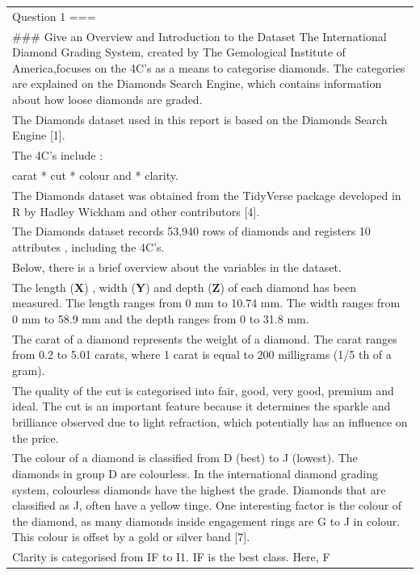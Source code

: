 \documentclass[
]{article}
\begin{document}
\begin{longtable}[]{@{}
  >{\raggedright\arraybackslash}p{}@{}}
\toprule\noalign{}
\endhead
\bottomrule\noalign{}
\endlastfoot
Question 1 === \\
\#\#\# Give an Overview and Introduction to the Dataset The
International Diamond Grading System, created by The Gemological
Institute of America,focuses on the 4C's as a means to categorise
diamonds. The categories are explained on the Diamonds Search Engine,
which contains information about how loose diamonds are graded. \\
The Diamonds dataset used in this report is based on the Diamonds Search
Engine {[}1{]}. \\
The 4C's include : \\
* carat * cut * colour and * clarity. \\
The Diamonds dataset was obtained from the TidyVerse package developed
in R by Hadley Wickham and other contributors {[}4{]}. \\
The Diamonds dataset records 53,940 rows of diamonds and registers 10
attributes , including the 4C's. \\
Below, there is a brief overview about the variables in the dataset. \\
The length (\textbf{X}) , width (\textbf{Y}) and depth (\textbf{Z}) of
each diamond has been measured. The length ranges from 0 mm to 10.74 mm.
The width ranges from 0 mm to 58.9 mm and the depth ranges from 0 to
31.8 mm. \\
The carat of a diamond represents the weight of a diamond. The carat
ranges from 0.2 to 5.01 carats, where 1 carat is equal to 200 milligrams
(1/5 th of a gram). \\
The quality of the cut is categorised into fair, good, very good,
premium and ideal. The cut is an important feature because it determines
the sparkle and brilliance observed due to light refraction, which
potentially has an influence on the price. \\
The colour of a diamond is classified from D (best) to J (lowest). The
diamonds in group D are colourless. In the international diamond grading
system, colourless diamonds have the highest the grade. Diamonds that
are classified as J, often have a yellow tinge. One interesting factor
is the colour of the diamond, as many diamonds inside engagement rings
are G to J in colour. This colour is offset by a gold or silver band
{[}7{]}. \\
Clarity is categorised from IF to I1. IF is the best class. Here, F

\end{longtable}
\end{document}
